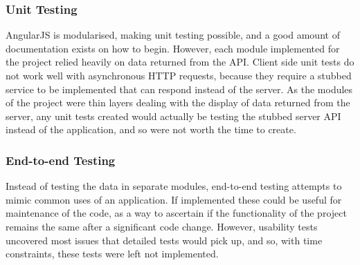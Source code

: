\subsubsection{Unit Testing}
AngularJS is modularised, making unit testing possible, and a good amount of documentation exists on how to begin. However, each module implemented for the project relied heavily on data returned from the API. Client side unit tests do not work well with asynchronous HTTP requests, because they require a stubbed service to be implemented that can respond instead of the server. As the modules of the project were thin layers dealing with the display of data returned from the server, any unit tests created would actually be testing the stubbed server API instead of the application, and so were not worth the time to create. 

\subsubsection{End-to-end Testing}
Instead of testing the data in separate modules, end-to-end testing attempts to mimic common uses of an application. If implemented these could be useful for maintenance of the code, as a way to ascertain if the functionality of the project remains the same after a significant code change. However, usability tests uncovered most issues that detailed tests would pick up, and so, with time constraints, these tests were left not implemented.